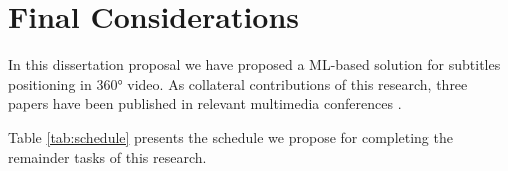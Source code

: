 \section{Final Considerations}
\label{sec_4}
In this dissertation proposal we have proposed a ML-based solution for subtitles positioning in 360° video. As collateral contributions of this research, three papers have been published in relevant multimedia conferences \cite{mendes2020cluster, mendes_2020, mendes2020ISM}.

Table \ref{tab:schedule} presents the schedule we propose for completing the remainder tasks of this research.

